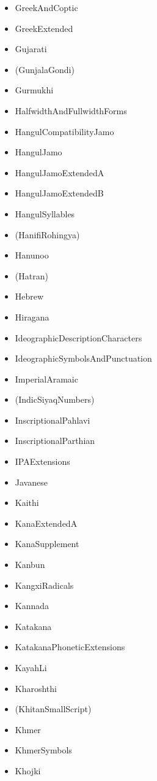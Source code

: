 \documentclass{article}
\newenvironment{itemlist}{%
  \begin{itemize}
  \setlength{\itemsep}{0pt}
  \setlength{\parsep}{0pt}
  \setlength{\topsep}{0pt}
  \setlength{\partopsep}{0pt}
  \setlength{\parskip}{0pt}
  \setlength{\labelsep}{5pt}}%
{
  \end{itemize}}
\begin{document}
\begin{multicols*}{2}
\begin{itemlist}
        \item GreekAndCoptic
        \item GreekExtended
        \item Gujarati
        \item (GunjalaGondi)
        \item Gurmukhi
        \item HalfwidthAndFullwidthForms
        \item HangulCompatibilityJamo
        \item HangulJamo
        \item HangulJamoExtendedA
        \item HangulJamoExtendedB
        \item HangulSyllables
        \item (HanifiRohingya)
        \item Hanunoo
        \item (Hatran)
        \item Hebrew
        \item Hiragana
        \item IdeographicDescriptionCharacters
        \item IdeographicSymbolsAndPunctuation
        \item ImperialAramaic
        \item (IndicSiyaqNumbers)
        \item InscriptionalPahlavi
        \item InscriptionalParthian
        \item IPAExtensions
        \item Javanese
        \item Kaithi
        \item KanaExtendedA
        \item KanaSupplement
        \item Kanbun
        \item KangxiRadicals
        \item Kannada
        \item Katakana
        \item KatakanaPhoneticExtensions
        \item KayahLi
        \item Kharoshthi
        \item (KhitanSmallScript)
        \item Khmer
        \item KhmerSymbols
        \item Khojki

\end{itemlist}
\end{multicols*}
\end{document}
